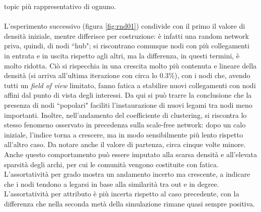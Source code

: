 \documentclass[a4paper,12pt]{article}
\begin{document}
topic più rappresentativo di ognuno.\\ \\
L'esperimento successivo (figura \ref{fig:rnd01}) condivide con il primo il valore di densità iniziale, mentre differisce per costruzione: è infatti una random network priva, quindi, di nodi ``hub"; si riscontrano comunque nodi con più collegamenti in entrata e in uscita rispetto agli altri, ma la differenza, in questi termini, è molto ridotta. Ciò si rispecchia in una crescita molto più contenuta e lineare della densità (si arriva all'ultima iterazione con circa lo $0.3\%$), con i nodi che, avendo tutti un \textit{field of view} limitato, fanno fatica a stabilire nuovi collegamenti con nodi affini dal punto di vista degli interessi. Da qui si può trarre la conclusione che la presenza di nodi ``popolari" faciliti l'instaurazione di nuovi legami tra nodi meno importanti.
Inoltre, nell'andamento del coefficiente di clustering, si riscontra lo stesso fenomeno osservato in precedenza sulla scale-free network: dopo un calo iniziale, l'indice torna a crescere, ma in modo sensibilmente più lento rispetto all'altro caso. Da notare anche il valore di partenza, circa cinque volte minore. Anche questo comportamento può essere imputato alla scarsa densità e all'elevata sparsità degli archi, per cui le comunità vengono costituite con fatica. L'assortatività per grado mostra un andamento incerto ma crescente, a indicare che i nodi tendono a legarsi in base alla similarità tra out e in degree. L'assortatività per attributo è più incerta rispetto al caso precedente, con la differenza che nella seconda metà della simulazione rimane quasi sempre positiva.
\end{document}

